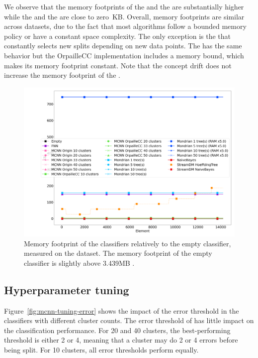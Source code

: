 We observe that the memory footprints of the \mondrianforest and the
\hoeffdingtree are substantially higher  while the \mcnns and the \naivebayes are
close to zero~KB.
Overall, memory footprints are similar across datasets, due to the
fact that most algorithms follow a bounded memory policy or have a constant
space complexity.  The only exception is the \hoeffdingtree that constantly
selects new splits depending on new data points. The \mondrianforest has the
same behavior but the OrpailleCC implementation includes a memory bound, which
makes its memory footprint constant. Note that the concept drift does not
increase the memory footprint of the \hoeffdingtree.


\begin{figure}
	\includegraphics[width=\linewidth]{figures/results/banos_6_memory.png}
	\caption{Memory footprint of the classifiers relatively to the empty
	classifier, measured on the \banosdataset dataset. The memory footprint of the empty
	classifier is slightly above 3.439MB .}
	\label{fig:memory}
\end{figure}


\subsection{Hyperparameter tuning}

Figure~\ref{fig:mcnn-tuning-error} shows the impact of the error threshold
in the \mcnn classifiers with different cluster counts. The error
threshold of \mcnn has little impact on the classification performance. For
20 and 40 clusters, the best-performing threshold is either 2 or 4, meaning
that a cluster may do 2 or 4 errors before being split. For 10 clusters,
all error thresholds perform equally.

